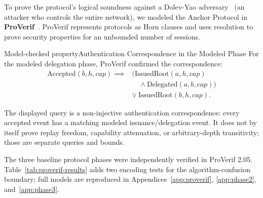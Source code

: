 \documentclass[11pt,a4paper]{article}
\theoremstyle{definition}
\begin{document}
To prove the protocol's logical soundness against a Dolev-Yao adversary~ (an attacker who controls the entire network), we modeled the Anchor Protocol in \textbf{ProVerif}~. ProVerif represents protocols as Horn clauses and uses resolution to prove security properties for an unbounded number of sessions.

\begin{pdclaim}{Model-checked property}{Authentication Correspondence in the Modeled Phase}
\setlength{\parskip}{4pt plus 1pt}
\label{thm:injective}
For the modeled delegation phase, ProVerif confirmed the correspondence:
\begin{align}
\text{Accepted}(b, h, cap) \implies{}&(\text{IssuedRoot}(a, h, cap) \nonumber\\
&\quad \land \text{Delegated}(a, b, cap)) \nonumber\\
& \lor \ \text{IssuedRoot}(b, h, cap).
\end{align}

The displayed query is a non-injective authentication correspondence: every accepted event has a matching modeled \mbox{issuance/delegation} event. It does not by itself prove replay freedom, capability attenuation, or arbitrary-depth transitivity; those are separate queries and bounds.
\end{pdclaim}

The three baseline protocol phases were independently verified in ProVerif 2.05.
Table~\ref{tab:proverif-results} adds two encoding tests for the algorithm-confusion
boundary; full models are reproduced in Appendices~\ref{app:proverif},
\ref{app:phase2}, and~\ref{app:phase3}.
\end{document}
